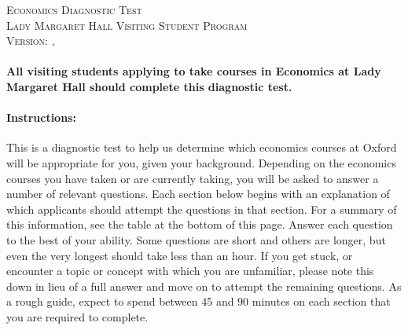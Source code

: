 \documentclass[addpoints,12pt]{exam}
\begin{document}
\begin{center}

  \textsc{\Large Economics Diagnostic Test \\ \normalsize Lady Margaret Hall Visiting Student Program \\ \vspace{0.5em} Version: \DTMtoday, \DTMcurrenttime}

\vspace{5em}



\end{center}

\vspace{2em}

\paragraph{All visiting students applying to take courses in Economics at Lady Margaret Hall should complete this diagnostic test.}

\vspace{2em}

\paragraph{Instructions:} This is a diagnostic test to help us determine which economics courses at Oxford will be appropriate for you, given your background. Depending on the economics courses you have taken or are currently taking, you will be asked to answer a number of relevant questions. Each section below begins with an explanation of which applicants should attempt the questions in that section. For a summary of this information, see the table at the bottom of this page. Answer each question to the best of your ability. Some questions are short and others are longer, but even the very longest should take less than an hour. If you get stuck, or encounter a topic or concept with which you are unfamiliar, please note this down in lieu of a full answer and move on to attempt the remaining questions. As a rough guide, expect to spend between 45 and 90 minutes on each section that you are required to complete.
\end{document}
